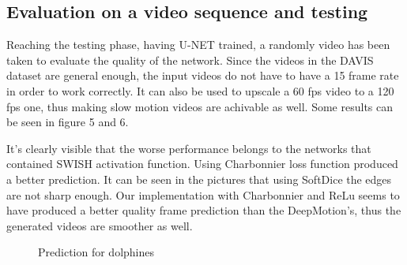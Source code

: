 \documentclass{article}
\begin{document}
\subsection{Evaluation on a video sequence and testing}

Reaching the testing phase, having U-NET trained, a randomly video has been taken to evaluate the quality of the network. Since the videos in the DAVIS dataset are general enough, the input videos do not have to have a 15 frame rate in order to work correctly. It can also be used to upscale a 60 fps video to a 120 fps one, thus making slow motion videos are achivable as well. Some results can be seen in figure 5 and 6.

It's clearly visible that the worse performance belongs to the networks that contained SWISH activation function. Using Charbonnier loss function produced a better prediction. It can be seen in the pictures that using SoftDice the edges are not sharp enough. Our implementation with Charbonnier and ReLu seems to have produced a better quality frame prediction than the DeepMotion's, thus the generated videos are smoother as well.

\begin{figure}%
	\centering
	\qquad
	\qquad
	\qquad
	\qquad
	\qquad
	\caption{Prediction for dolphines}%
	\label{fig:example}%
\end{figure}
\end{document}
